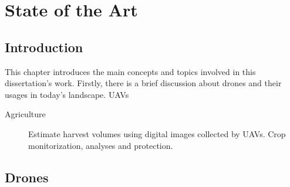 \chapter{State of the Art} \label{ch:Concepts}

\section{Introduction}

This chapter introduces the main concepts and topics involved in this dissertation's work. Firstly, there is a brief discussion about drones and their usages in today's landscape. \cite{uavhist} \ac{UAV}s
\begin{description}
    \item[Agriculture] Estimate harvest volumes using digital images collected by \ac{UAV}s\cite{harvest}. Crop monitorization, analyses and protection\cite{crop}\cite{analyses}.  
\end{description}

\section{Drones} 



